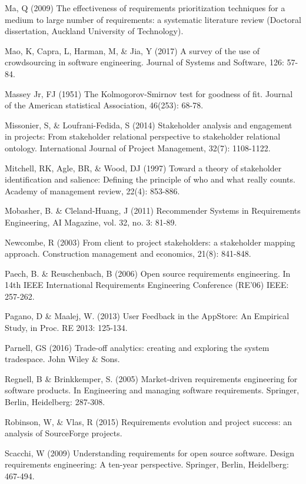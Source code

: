 \begin{thebibliography}{}
Ma, Q (2009) The effectiveness of requirements prioritization techniques for a medium to large number of requirements: a systematic literature review (Doctoral dissertation, Auckland University of Technology).

Mao, K, Capra, L, Harman, M, \& Jia, Y (2017) A survey of the use of crowdsourcing in software engineering. Journal of Systems and Software, 126: 57-84.

Massey Jr, FJ (1951) The Kolmogorov-Smirnov test for goodness of fit. Journal of the American statistical Association, 46(253): 68-78.

Missonier, S, \& Loufrani-Fedida, S (2014) Stakeholder analysis and engagement in projects: From stakeholder relational perspective to stakeholder relational ontology. International Journal of Project Management, 32(7): 1108-1122.

Mitchell, RK, Agle, BR, \& Wood, DJ (1997) Toward a theory of stakeholder identification and salience: Defining the principle of who and what really counts. Academy of management review, 22(4): 853-886.

Mobasher, B. \& Cleland-Huang, J (2011) Recommender Systems in Requirements Engineering, AI Magazine, vol. 32, no. 3: 81-89.

Newcombe, R (2003) From client to project stakeholders: a stakeholder mapping approach. Construction management and economics, 21(8): 841-848.

Paech, B. \& Reuschenbach, B (2006) Open source requirements engineering. In 14th IEEE International Requirements Engineering Conference (RE'06) IEEE: 257-262.

Pagano, D \& Maalej, W. (2013) User Feedback in the AppStore: An Empirical Study, in Proc. RE 2013: 125-134.

Parnell, GS (2016) Trade-off analytics: creating and exploring the system tradespace. John Wiley \& Sons.

Regnell, B \& Brinkkemper, S. (2005) Market-driven requirements engineering for software products. In Engineering and managing software requirements. Springer, Berlin, Heidelberg: 287-308.

Robinson, W, \& Vlas, R (2015) Requirements evolution and project success: an analysis of SourceForge projects.


Scacchi, W (2009) Understanding requirements for open source software. Design requirements engineering: A ten-year perspective. Springer, Berlin, Heidelberg: 467-494.


\end{thebibliography}
